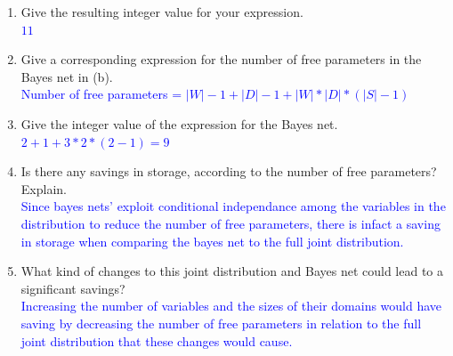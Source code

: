 \documentclass[12pt]{article}
\newenvironment{qparts}{\begin{enumerate}[{(}a{)}]}{\end{enumerate}}
\newenvironment{qsubparts}{\begin{enumerate}[{(}i{)}]}{\end{enumerate}}
\begin{document}
\begin{qparts}
\begin{qsubparts}
    \item Give the resulting integer value for your expression.\\
    \textcolor{blue}{$11$}

    \item Give a corresponding expression for the number of free parameters in the
    Bayes net in (b).\\
    \textcolor{blue}{Number of free parameters = $|W|-1 + |D|-1 + |W|*|D|*(|S|-1)$}
    \item Give the integer value of the expression for the Bayes net.\\
    \textcolor{blue}{$2 + 1 + 3*2*(2-1) = 9$}
    \item Is there any savings in storage, according to the number of free parameters?
    Explain.\\
    \textcolor{blue}{Since bayes nets' exploit conditional independance among the variables in the distribution to reduce the number of free parameters, there is infact a saving in storage when comparing the bayes net to the full joint distribution.}

    \item What kind of changes to this joint distribution and Bayes net could lead to a significant savings?\\
    \textcolor{blue}{Increasing the number of variables and the sizes of their domains would have saving by decreasing the number of free parameters in relation to the full joint distribution that these changes would cause.}
  \end{qsubparts}
\end{qparts}
\end{document}
